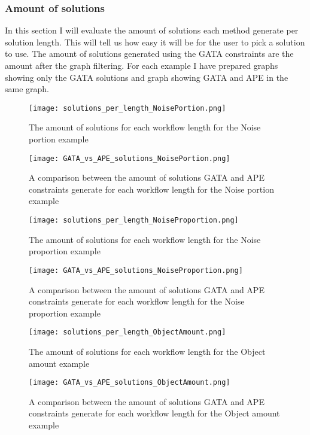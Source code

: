 \documentclass{article}
\begin{document}
\subsubsection{Amount of solutions}
In this section I will evaluate the amount of solutions each method generate per solution length. This will tell us how easy it will be for the user to pick a solution to use. The amount of solutions generated using the GATA constraints are the amount after the graph filtering. For each example I have prepared graphs showing only the GATA solutions and graph showing GATA and APE in the same graph. 




\begin{figure}[H]
  \centering
    \texttt{[image: solutions\_per\_length\_NoisePortion.png]}
    \caption{The amount of solutions for each workflow length for the Noise portion example}
    \label{figure:solutionsperLengthPortion}
\end{figure}
\begin{figure}[H]
  \centering
    \texttt{[image: GATA\_vs\_APE\_solutions\_NoisePortion.png]}
    \caption{A comparison between the amount of solutions  GATA and APE constraints generate for each workflow length for the Noise portion example}
    \label{figure:solutionsperLengthPortion}
\end{figure}




\begin{figure}[H]
  \centering
    \texttt{[image: solutions\_per\_length\_NoiseProportion.png]}
    \caption{The amount of solutions for each workflow length for the Noise proportion example}
    \label{figure:solutionsperLengthPortion}
\end{figure}
\begin{figure}[H]
  \centering
    \texttt{[image: GATA\_vs\_APE\_solutions\_NoiseProportion.png]}
    \caption{A comparison between the amount of solutions  GATA and APE constraints generate for each workflow length for the Noise proportion example}
    \label{figure:solutionsperLengthPortion}
\end{figure}

\begin{figure}[H]
  \centering
    \texttt{[image: solutions\_per\_length\_ObjectAmount.png]}
    \caption{The amount of solutions for each workflow length for the Object amount example}
    \label{figure:solutionsperLengthPortion}
\end{figure}
\begin{figure}[H]
  \centering
    \texttt{[image: GATA\_vs\_APE\_solutions\_ObjectAmount.png]}
    \caption{A comparison between the amount of solutions  GATA and APE constraints generate for each workflow length for the Object amount example}
    \label{figure:solutionsperLengthPortion}
\end{figure}
\end{document}

